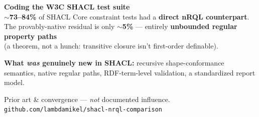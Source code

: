 \documentclass[11pt]{article}
\begin{document}
\vspace{14pt}

\begin{tcolorbox}[colback=graybg, colframe=black!15, boxrule=0.8pt, arc=3mm, left=8mm, right=8mm, top=7mm, bottom=7mm]
\centering\color{ink}
{\huge\bfseries Coding the W3C SHACL test suite}\\[12pt]
{\Large $\sim$\textbf{73--84\%} of SHACL Core constraint tests had a \textbf{direct nRQL counterpart}.}\\[8pt]
{\Large The provably-native residual is only $\sim$\textbf{5\%} --- entirely \textbf{unbounded regular property paths}}\\[5pt]
{\Large (a theorem, not a hunch: transitive closure isn't first-order definable).}
\end{tcolorbox}

\vspace{9pt}
{\Large\color{nrqlgreen}\bfseries What \emph{was} genuinely new in SHACL:}
{\Large\color{ink} recursive shape-conformance semantics, native regular paths, RDF-term-level validation, a standardized report model.}\par

\vspace{7pt}
{\color{muted}\large Prior art \& convergence --- \emph{not} documented influence. \qquad
\texttt{github.com/lambdamikel/shacl-nrql-comparison}\par}
\end{document}
